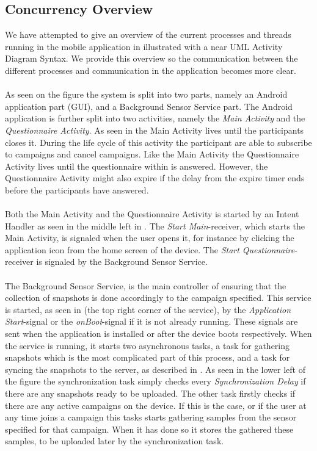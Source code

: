 \subsection{Concurrency Overview}
We have attempted to give an overview of the current processes and threads running in the mobile application in  illustrated with a near UML Activity Diagram Syntax. We provide this overview so the communication between the different processes and communication in the application becomes more clear.
\\\\
As seen on the figure the system is split into two parts, namely an Android application part (GUI), and a Background Sensor Service part. The Android application is further split into two activities, namely the \emph{Main Activity} and the \emph{Questionnaire Activity}. As seen in  the Main Activity lives until the participants closes it. During the life cycle of this activity the participant are able to subscribe to campaigns and cancel campaigns. Like the Main Activity the Questionnaire Activity lives until the questionnaire within is answered. However, the Questionnaire Activity might also expire if the delay from the expire timer ends before the participants have answered. 
\\\\
Both the Main Activity and the Questionnaire Activity is started by an Intent Handler as seen in the middle left in . The \emph{Start Main}-receiver, which starts the Main Activity, is signaled when the user opens it, for instance by clicking the application icon from the home screen of the device. The \emph{Start Questionnaire}-receiver is signaled by the Background Sensor Service.
\\\\
The Background Sensor Service, is the main controller of ensuring that the collection of snapshots is done accordingly to the campaign specified. This service is started, as seen in  (the top right corner of the service), by the \emph{Application Start}-signal or the \emph{onBoot}-signal if it is not already running. These signals are sent when the application is installed or after the device boots respectively. When the service is running, it starts two asynchronous tasks, a task for gathering snapshots which is the most complicated part of this process, and a task for syncing the snapshots to the server, as described in . As seen in the lower left of the figure the synchronization task simply checks every \emph{Synchronization Delay} if there are any snapshots ready to be uploaded. The other task firstly checks if there are any active campaigns on the device. If this is the case, or if the user at any time joins a campaign this tasks starts gathering samples from the sensor specified for that campaign. When it has done so it stores the gathered these samples, to be uploaded later by the synchronization task.

